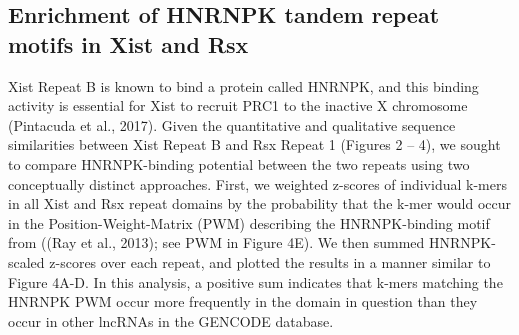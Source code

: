 \subsection{Enrichment of HNRNPK tandem repeat motifs in Xist and Rsx}
Xist Repeat B is known to bind a protein called HNRNPK, and this binding activity is essential for Xist to recruit PRC1 to the inactive X chromosome (Pintacuda et al., 2017). Given the quantitative and qualitative sequence similarities between Xist Repeat B and Rsx Repeat 1 (Figures 2 – 4), we sought to compare HNRNPK-binding potential between the two repeats using two conceptually distinct approaches. First, we weighted z-scores of individual k-mers in all Xist and Rsx repeat domains by the probability that the k-mer would occur in the Position-Weight-Matrix (PWM) describing the HNRNPK-binding motif from ((Ray et al., 2013); see PWM in Figure 4E). We then summed HNRNPK-scaled z-scores over each repeat, and plotted the results in a manner similar to Figure 4A-D. In this analysis, a positive sum indicates that k-mers matching the HNRNPK PWM occur more frequently in the domain in question than they occur in other lncRNAs in the GENCODE database.

